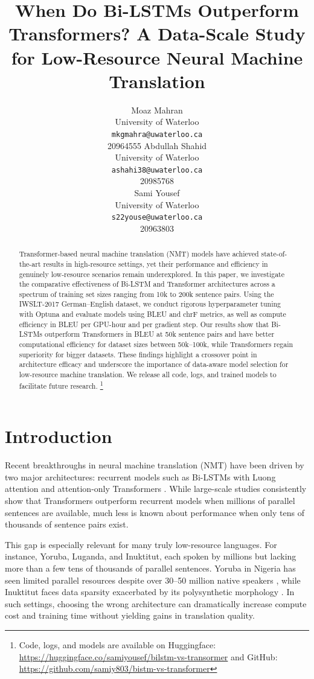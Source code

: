 \documentclass{article}
\title{When Do Bi-LSTMs Outperform Transformers? A Data-Scale Study for Low-Resource Neural Machine Translation}
\author{%
  Moaz Mahran \\
  University of Waterloo\\
  \texttt{mkgmahra@uwaterloo.ca} \\
  {20964555}
  \And
    Abdullah Shahid \\
  University of Waterloo \\
  \texttt{ashahi38@uwaterloo.ca} \\
  {20985768} \\
  \And
    Sami Yousef\\
  University of Waterloo\\
  \texttt{s22youse@uwaterloo.ca} \\
  {20963803} \\
}
\begin{document}
\maketitle

\begin{abstract}
Transformer-based neural machine translation (NMT) models have achieved state-of-the-art results in high-resource settings, yet their performance and efficiency in genuinely low-resource scenarios remain underexplored. In this paper, we investigate the comparative effectiveness of Bi-LSTM and Transformer architectures across a spectrum of training set sizes ranging from 10k to 200k sentence pairs. Using the IWSLT-2017 German–English dataset, we conduct rigorous hyperparameter tuning with Optuna and evaluate models using BLEU and chrF metrics, as well as compute efficiency in BLEU per GPU-hour and per gradient step. Our results show that Bi-LSTMs outperform Transformers in BLEU at 50k sentence pairs and have better computational efficiency for dataset sizes between 50k–100k, while Transformers regain superiority for bigger datasets. These findings highlight a crossover point in architecture efficacy and underscore the importance of data-aware model selection for low-resource machine translation. We release all code, logs, and trained models to facilitate future research. \footnote{Code, logs, and models are available on Huggingface: \url{https://huggingface.co/samiyousef/bilstm-vs-transormer} and GitHub: \url{https://github.com/samiy803/bistm-vs-transformer}}
\end{abstract}


\section{Introduction}
\label{sec:intro}

Recent breakthroughs in neural machine translation (NMT) have been driven by two major architectures: recurrent models such as Bi-LSTMs \citep{GRAVES2005602} with Luong \citep{luong2015effectiveapproachesattentionbasedneural} attention and attention-only Transformers \citep{vaswani2017attention}. While large-scale studies consistently show that Transformers outperform recurrent models when millions of parallel sentences are available, much less is known about performance when only tens of thousands of sentence pairs exist.

This gap is especially relevant for many truly low-resource languages. For instance, Yoruba, Luganda, and Inuktitut, each spoken by millions but lacking more than a few tens of thousands of parallel sentences. Yoruba in Nigeria has seen limited parallel resources despite over 30–50 million native speakers \citep{adelani2021effect, marote2024bridging}, while Inuktitut faces data sparsity exacerbated by its polysynthetic morphology \citep{roest2020inuktitut, joanis2020nunavut}. In such settings, choosing the wrong architecture can dramatically increase compute cost and training time without yielding gains in translation quality.
\end{document}
